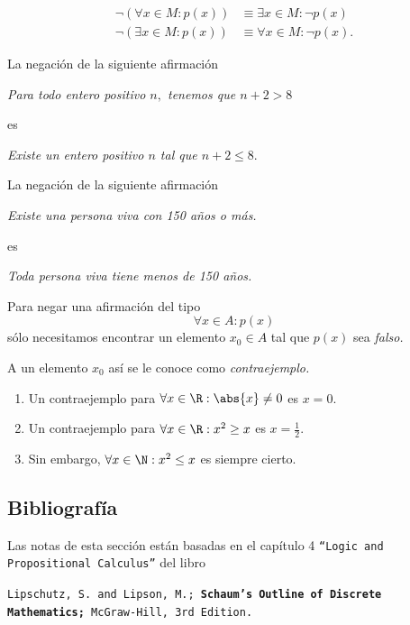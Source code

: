  \begin{teorema}[DeMorgan]
  \begin{align}
  \label{lip:thm:4.4}
   \neg\left( \forall x\in M: p(x) \right)& \equiv \exists x\in M: \neg p(x)\\
   \label{lip:thm:4.5}
   \neg\left( \exists x\in M: p(x) \right)& \equiv \forall x\in M: \neg p(x).
  \end{align}

 \end{teorema}




 \begin{resuelto}
  \label{lip:exmp:4.10.a}
  La negación de la siguiente afirmación
  \begin{center}
   \emph{Para todo entero positivo $n,$ tenemos que $n+2>8$}
  \end{center}
es
\begin{center}
 \emph{Existe un entero positivo $n$ tal que $n+2 \leq 8.$}
\end{center}

 \end{resuelto}




 \begin{resuelto}
  \label{lip:exmp:4.10.b}
  La negación de la siguiente afirmación
  \begin{center}
   \emph{Existe una persona viva con 150 a\~nos o más.}
  \end{center}
 es
 \begin{center}
  \emph{Toda persona viva tiene menos de 150 a\~nos.}
 \end{center}

 \end{resuelto}

 \begin{observacion}
  Para negar una afirmación del tipo $$\forall x \in A: p(x)$$ sólo necesitamos encontrar un elemento $x_{0}\in A$ tal que $p(x)$ sea \emph{falso.}


   A un elemento $x_{0}$ así se le conoce como \emph{contraejemplo.}
 \end{observacion}

 \begin{resuelto}
 \label{lip:4.11}
  \begin{enumerate}
   \item
  Un contraejemplo para $\forall x \in \R: \abs{x}\neq 0$ es $x=0.$
   \item
  Un contraejemplo para $\forall x \in \R: x^{2}\geq x$ es $x=\frac{1}{2}.$
   \item
   Sin embargo, $\forall x \in \N: x^{2}\leq x$ es siempre cierto.
  \end{enumerate}
 \end{resuelto}

\subsection{Bibliografía}
Las notas de esta sección están basadas en el capítulo 4 \texttt{``Logic and Propositional Calculus''} del libro
\begin{center}
 \texttt{Lipschutz, S. and Lipson, M.; \textbf{Schaum's Outline of Discrete Mathematics;} McGraw-Hill, 3rd Edition.}
\end{center}
